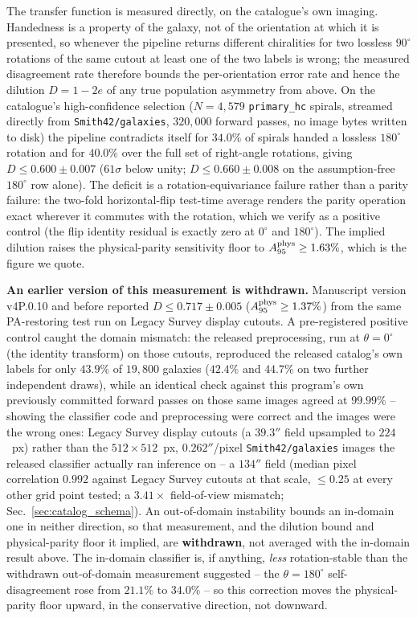 \documentclass[twocolumn,linenumbers]{aastex702}
\begin{document}
The transfer function is measured directly, on the catalogue's own
imaging. Handedness is a property of the galaxy, not of the orientation at
which it is presented, so whenever the pipeline returns different
chiralities for two lossless $90^\circ$ rotations of the same cutout at
least one of the two labels is wrong; the measured disagreement rate
therefore bounds the per-orientation error rate and hence the dilution
$D = 1 - 2e$ of any true population asymmetry from above. On the
catalogue's high-confidence selection ($N=4{,}579$ \texttt{primary\_hc}
spirals, streamed directly from \texttt{Smith42/galaxies}, $320{,}000$
forward passes, no image bytes written to disk) the pipeline contradicts
itself for $34.0\%$ of spirals handed a lossless $180^\circ$ rotation and
for $40.0\%$ over the full set of right-angle rotations, giving
$D \le 0.600 \pm 0.007$ ($61\sigma$ below unity; $D \le 0.660 \pm 0.008$
on the assumption-free $180^\circ$ row alone). The deficit is a
rotation-equivariance failure rather than a parity failure: the two-fold
horizontal-flip test-time average renders the parity operation exact
wherever it commutes with the rotation, which we verify as a positive
control (the flip identity residual is exactly zero at $0^\circ$ and
$180^\circ$). The implied dilution raises the physical-parity sensitivity
floor to $A_{95}^{\rm phys} \ge 1.63\%$, which is the figure we quote.

\textbf{An earlier version of this measurement is withdrawn.} Manuscript
version v4P.0.10 and before reported $D \le 0.717 \pm 0.005$
($A_{95}^{\rm phys} \ge 1.37\%$) from the same PA-restoring test run on
Legacy Survey display cutouts. A pre-registered positive control caught
the domain mismatch: the released preprocessing, run at $\theta=0^\circ$
(the identity transform) on those cutouts, reproduced the released
catalog's own labels for only $43.9\%$ of $19{,}800$ galaxies ($42.4\%$
and $44.7\%$ on two further independent draws), while an identical check
against this program's own previously committed forward passes on those
same images agreed at $99.99\%$ -- showing the classifier code and
preprocessing were correct and the images were the wrong ones: Legacy
Survey display cutouts (a $39.3''$ field upsampled to $224$~px) rather
than the $512\times512$~px, $0.262''$/pixel \texttt{Smith42/galaxies}
images the released classifier actually ran inference on -- a $134''$
field (median pixel correlation $0.992$ against Legacy Survey cutouts at
that scale, $\le 0.25$ at every other grid point tested; a $3.41\times$
field-of-view mismatch; Sec.~\ref{sec:catalog_schema}). An out-of-domain
instability bounds an in-domain one in neither direction, so that
measurement, and the dilution bound and physical-parity floor it implied,
are \textbf{withdrawn}, not averaged with the in-domain result above. The
in-domain classifier is, if anything, \emph{less} rotation-stable than the
withdrawn out-of-domain measurement suggested -- the $\theta=180^\circ$
self-disagreement rose from $21.1\%$ to $34.0\%$ -- so this correction
moves the physical-parity floor upward, in the conservative direction, not
downward.
\end{document}

